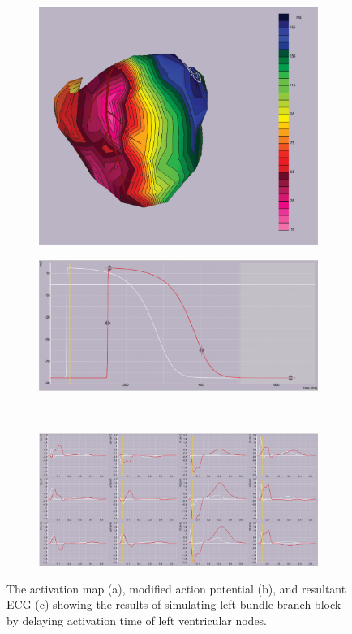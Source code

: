 \documentclass[12pt]{article}
\begin{document}
\begin{figure}[H]
	\begin{subfigure}{.5\textwidth}
		\centering
		\includegraphics[width=.95\linewidth]{Figures/2_3_actTimes.png}
		\caption{}
		
	\end{subfigure}%
	\begin{subfigure}{.5\textwidth}
		\centering
		\includegraphics[width=.95\linewidth]{Figures/2_3_actionPotential.png}
		\caption{}
		
	\end{subfigure}%
	\\
	\begin{subfigure}{.95\textwidth}
		\centering
		\includegraphics[width=.95\linewidth]{Figures/2_3_ecg.png}
		\caption{}
		
	\end{subfigure}
	\caption{The activation map (a), modified action potential (b), and resultant ECG (c) showing the results of simulating left bundle branch block by delaying activation time of left ventricular nodes.}
	\label{2_3}
\end{figure}
\end{document}
